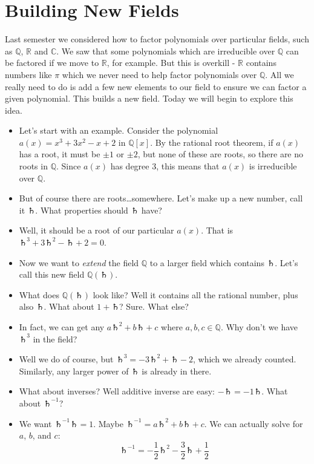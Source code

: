 \documentclass[12pt]{article}
\def\a{\Saturn}
\theoremstyle{plain}
\theoremstyle{definition}
\theoremstyle{remark}
\def\R{\mathbb R}
\def\Q{\mathbb Q}
\def\C{\mathbb C}
\def\inv{^{-1}}
\newcommand{\todayis}[1]{\clearpage{\rhead{\footnotesize #1}}}
\begin{document}
\todayis{Monday, January 7}

\section*{Building New Fields}

Last semester we considered how to factor polynomials over particular fields, such as $\Q$, $\R$ and $\C$.  We saw that some polynomials which are irreducible over $\Q$ can be factored if we move to $\R$, for example.  But this is overkill - $\R$ contains numbers like $\pi$ which we never need to help factor polynomials over $\Q$.  All we really need to do is add a few new elements to our field to ensure we can factor a given polynomial.  This builds a new field.  Today we will begin to explore this idea.

\begin{itemize}
\item Let's start with an example.  Consider the polynomial $a(x) = x^3 + 3x^2 - x + 2$ in $\Q[x]$.  By the rational root theorem, if $a(x)$ has a root, it must be $\pm 1$ or $\pm 2$, but none of these are roots, so there are no roots in $\Q$.  Since $a(x)$ has degree 3, this means that $a(x)$ is irreducible over $\Q$.  
\item But of course there are roots\ldots somewhere.  Let's make up a new number, call it $\a$.  What properties should $\a$ have? 
\item Well, it should be a root of our particular $a(x)$.  That is $\a^3 + 3\a^2 - \a + 2 = 0$.
\item Now we want to {\em extend} the field $\Q$ to a larger field which contains $\a$.  Let's call this new field $\Q(\a)$.
\item What does $\Q(\a)$ look like?  Well it contains all the rational number, plus also $\a$.  What about $1+\a$?  Sure.  What else?
\item In fact, we can get any $a\a^2 + b\a + c$ where $a, b, c\in \Q$.  Why don't we have $\a^3$ in the field?  
\item Well we do of course, but $\a^3 = -3\a^2 + \a - 2$, which we already counted.  Similarly, any larger power of $\a$ is already in there.
\item What about inverses?  Well additive inverse are easy: $-\a = -1\a$.  What about $\a\inv$?  
\item We want $\a\inv \a = 1$.  Maybe $\a\inv = a\a^2 + b\a + c$.  We can actually solve for $a$, $b$, and $c$:
\[\a\inv = -\frac{1}{2}\a^2 -\frac{3}{2}\a + \frac{1}{2}\]

\end{itemize}
\end{document}
